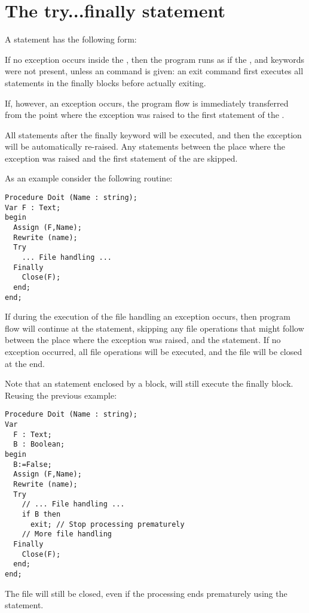 \section{The try...finally statement}
  

A  statement has the following form:

If no exception occurs inside the , then the program
runs as if the ,  and  keywords were not
present, unless an  command is given: an exit command first 
executes all statements in the finally blocks before actually exiting.

If, however, an exception occurs, the program flow is immediately
transferred from the point where the exception was raised to the first
statement of the .

All statements after the finally keyword will be executed, and then
the exception will be automatically re-raised. Any statements between the
place where the exception was raised and the first statement of the
 are skipped.

As an example consider the following routine:
\begin{verbatim}
Procedure Doit (Name : string);
Var F : Text;
begin
  Assign (F,Name);
  Rewrite (name);
  Try
    ... File handling ...
  Finally
    Close(F);
  end;
end;
\end{verbatim}
If during the execution of the file handling an exception occurs, then
program flow will continue at the  statement, skipping any
file operations that might follow between the place where the exception
was raised, and the  statement.
If no exception occurred, all file operations will be executed, and the file
will be closed at the end.

Note that an  statement enclosed by a  block,
will still execute the finally block. Reusing the previous example:
\begin{verbatim}
Procedure Doit (Name : string);
Var 
  F : Text;
  B : Boolean;
begin
  B:=False;
  Assign (F,Name);
  Rewrite (name);
  Try
    // ... File handling ...
    if B then 
      exit; // Stop processing prematurely
    // More file handling
  Finally
    Close(F);
  end;
end;
\end{verbatim}
The file will still be closed, even if the processing ends prematurely using
the  statement.

